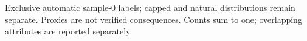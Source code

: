 Exclusive automatic sample-0 labels; capped and natural distributions remain separate. Proxies are not verified consequences. Counts sum to one; overlapping attributes are reported separately.
